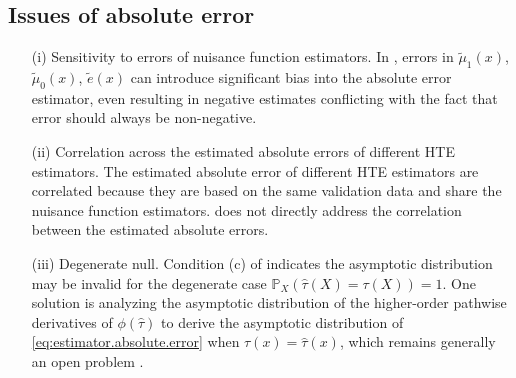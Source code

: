 \documentclass[twoside]{article}
\newcommand{\1}{{\mathbbm{1}}}
\def\PP{\mathbb{P}}
\begin{document}
\subsection{Issues of absolute error}\label{sec:absolute.error.issue}

\begin{itemize}
    \item [(i)] Sensitivity to errors of nuisance function estimators. 
    In , errors in $\tilde{\mu}_1(x)$, $\tilde{\mu}_0(x)$, $\tilde{e}(x)$ can introduce significant bias into the absolute error estimator, even resulting in negative estimates conflicting with the fact that error should always be non-negative. 
    
    \item [(ii)] Correlation across the estimated absolute errors of different HTE estimators.
    The estimated absolute error of different HTE estimators are correlated because they are based on the same validation data and share the nuisance function estimators.
     does not directly address the correlation between the estimated absolute errors.

    \item [(iii)] Degenerate null. Condition (c) of  indicates the asymptotic distribution may be invalid for the degenerate case $\PP_X(\hat{\tau}(X) = \tau(X)) = 1$. 
    One solution is analyzing the asymptotic distribution of the higher-order pathwise derivatives of $\phi(\hat{\tau})$ to derive the asymptotic distribution of \eqref{eq:estimator.absolute.error} when $\tau(x) = \hat{\tau}(x)$, which remains generally an open problem \parencite{hines2022variable, hudson2023nonparametric}.

\end{itemize}
\end{document}

